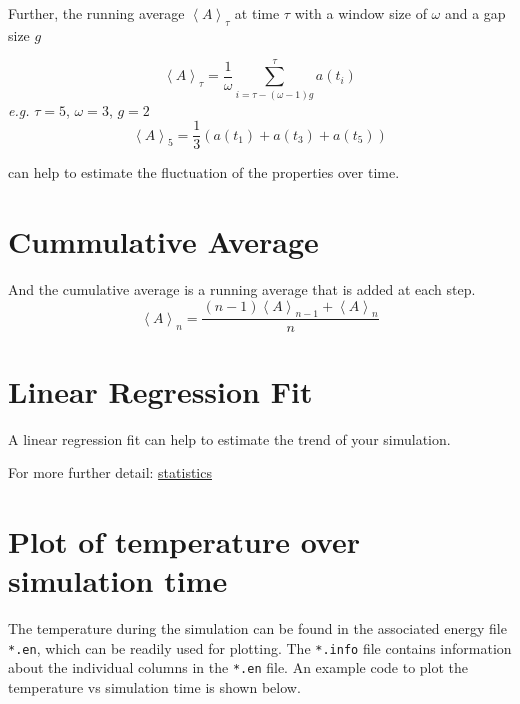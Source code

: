 \documentclass[
  letterpaper,
  DIV=11,
  numbers=noendperiod]{scrreprt}
\begin{document}
Further, the running average \(\left < A \right >_{\tau}\) at time
\(\tau\) with a window size of \(\omega\) and a gap size \(g\)

\[
\left < A \right >_{\tau} = \frac{1}{\omega}\sum_{i=\tau-(\omega-1)g}^{\tau} a(t_{i})
\] \emph{e.g.} \(\tau=5\), \(\omega=3\), \(g=2\) \[
\left < A \right >_{5} = \frac{1}{3} (a(t_{1})+a(t_{3})+a(t_{5}))
\]

can help to estimate the fluctuation of the properties over time.

\hypertarget{cummulative-average}{%
\section{Cummulative Average}\label{cummulative-average}}

And the cumulative average is a running average that is added at each
step. \[
\left < A \right >_n = \frac{(n-1)\left < A \right >_{n-1} + \left < A \right >_n}{n}
\]

\hypertarget{linear-regression-fit}{%
\section{Linear Regression Fit}\label{linear-regression-fit}}

A linear regression fit can help to estimate the trend of your
simulation.

For more further detail:
\protect\hyperlink{statistical-excursion}{statistics}

\hypertarget{plot-of-temperature-over-simulation-time}{%
\section{Plot of temperature over simulation
time}\label{plot-of-temperature-over-simulation-time}}

The temperature during the simulation can be found in the associated
energy file \texttt{*.en}, which can be readily used for plotting. The
\texttt{*.info} file contains information about the individual columns
in the \texttt{*.en} file. An example code to plot the temperature vs
simulation time is shown below.
\end{document}
